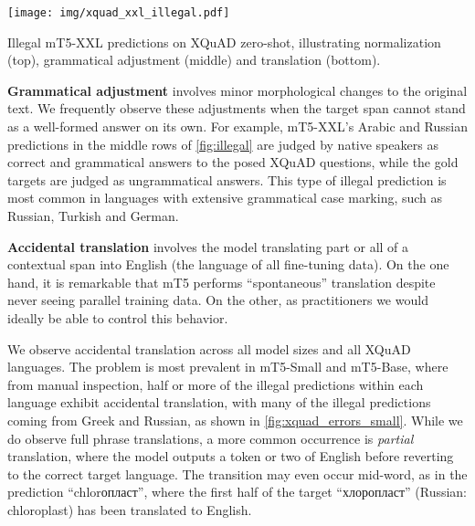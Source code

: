 \documentclass[11pt]{article}
\begin{document}
\begin{table}
    \centering
    \texttt{[image: img/xquad\_xxl\_illegal.pdf]}
    \caption{Illegal mT5-XXL predictions on XQuAD zero-shot, illustrating normalization (top), grammatical adjustment (middle) and translation (bottom).}
    \label{fig:illegal}
\end{table}

\textbf{Grammatical adjustment} involves minor morphological changes to the original text. 
We frequently observe these adjustments when the target span cannot stand as a well-formed answer on its own.
For example, mT5-XXL's Arabic and Russian predictions in the middle rows of \cref{fig:illegal} are judged by native speakers as correct and grammatical answers to the posed XQuAD questions, while the gold targets are judged as ungrammatical answers.
This type of illegal prediction is most common in languages with extensive grammatical case marking, such as Russian, Turkish and German.



\textbf{Accidental translation} involves the model translating part or all of a contextual span into English (the language of all fine-tuning data).
On the one hand, it is remarkable that mT5 performs ``spontaneous'' translation despite never seeing parallel training data.
On the other, as practitioners we would ideally be able to control this behavior.




We observe accidental translation across all model sizes and all XQuAD languages.
The problem is most prevalent in mT5-Small and mT5-Base, where from manual inspection, half or more of the illegal predictions within each language exhibit accidental translation, with many of the illegal predictions coming from Greek and Russian, as shown in \cref{fig:xquad_errors_small}.
While we do observe full phrase translations, a more common occurrence is \emph{partial} translation, where the model outputs a token or two of English before reverting to the correct target language.
The transition may even occur mid-word, as in the prediction ``chlor\foreignlanguage{russian}{опласт}'', where the first half of the target ``\foreignlanguage{russian}{хлоропласт}'' (Russian: chloroplast) has been translated to English.
\end{document}
